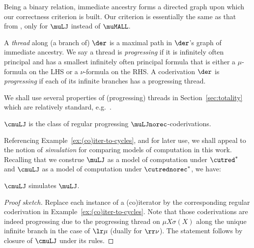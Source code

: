 Being a binary relation, immediate ancestry forms a directed graph upon which our correctness criterion is built. 
Our criterion is essentially the same as that from \cite{BaeldeDS16Infinitaryprooftheory}, only for $\muLJ$ instead of $\muMALL$. 



\begin{defn}
    \label{defn:progressiveness}
    A \emph{thread} along (a branch of) $\der$ is a maximal path in $\der$'s graph of immediate ancestry.
We say a thread is \emph{progressing} if it is infinitely often principal and has a smallest infinitely often principal formula that is either a $\mu$-formula on the LHS or a $\nu$-formula on the RHS.
% 
A coderivation $\der$ is \emph{progressing} if each of its infinite branches has a progressing thread.
\end{defn}

We shall use several properties of (progressing) threads in Section~\ref{sec:totality} 
which are relatively standard, e.g.~\cite{Koz83:results-on-mu,Studer08:mu-calc,KupMarVen22:graph-reps-mu-forms}.

\begin{defn}
    $\cmuLJ$ is the class of regular progressing $\muLJnorec$-coderivations.
\end{defn}


Referencing Example~\ref{ex:(co)iter-to-cycles}, and for later use, we shall appeal to the notion of \emph{simulation} for comparing models of computation in this work. 
Recalling that we construe $\muLJ$ as a model of computation under $\cutred^*$ and $\cmuLJ$ as a model of computation under $\cutrednorec^*$, we have:

\begin{proposition}[Simulation]
\label{prop:cmulj-simulates-mulj}
$\cmuLJ$ simulates $\muLJ$.
\end{proposition}

\begin{proof}[Proof sketch]
    Replace each instance of a (co)iterator by the corresponding regular coderivation in Example~\ref{ex:(co)iter-to-cycles}.
    Note that those coderivations are indeed progressing due to the progressing thread on $\mu X \sigma(X)$ along the unique infinite branch in the case of $\lr \mu$ (dually for $\rr \nu$).
    The statement follows by closure of $\cmuLJ$ under its rules.
\end{proof}


